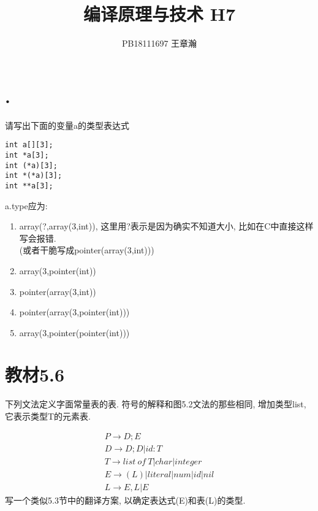 \documentclass[UTF8]{article}
\title{编译原理与技术 H7}
\date{}
\author{PB18111697 王章瀚}
\begin{document}
\maketitle
\section*{.}
\noindent 请写出下面的变量a的类型表达式
\begin{lstlisting}
int a[][3];
int *a[3];
int (*a)[3];
int *(*a)[3];
int **a[3];
\end{lstlisting}
\noindent a.type应为:
\begin{enumerate}[1. ]
	\item array(?,array(3,int)), 这里用?表示是因为确实不知道大小, 比如在C中直接这样写会报错.\\
	(或者干脆写成pointer(array(3,int)))
	\item array(3,pointer(int))
	\item pointer(array(3,int))
	\item pointer(array(3,pointer(int)))
	\item array(3,pointer(pointer(int)))
\end{enumerate}

\section*{教材5.6}
\noindent 下列文法定义字面常量表的表. 符号的解释和图5.2文法的那些相同, 增加类型list, 它表示类型T的元素表.

$$\begin{array}{l}
P \rightarrow D; E\\
D \rightarrow D; D | id : T\\
T \rightarrow list\ of\ T | char | integer\\
E \rightarrow (L) | literal | num | id | nil\\
L \rightarrow E, L | E
\end{array}$$
\noindent 写一个类似5.3节中的翻译方案, 以确定表达式(E)和表(L)的类型.\\
\end{document}
